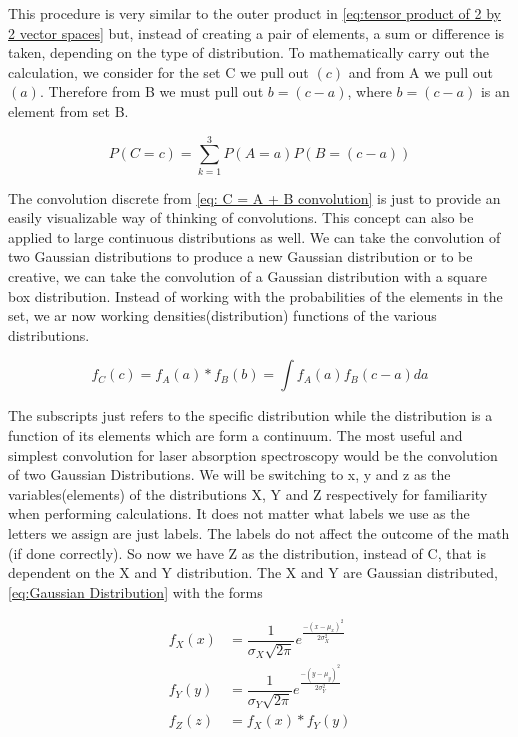 \documentclass[11pt,a4paper]{book}
\begin{document}
		This procedure is very similar to the outer product in \autoref{eq:tensor product of 2 by 2 vector spaces} but, instead of creating a pair of elements, a sum or difference is taken, depending on the type of distribution. To mathematically carry out the calculation, we consider for the set C we pull out $(c)$ and from A we pull out $(a)$. Therefore from B we must pull out $b = (c-a)$, where $b = (c-a)$ is an element from set B.
		
		\begin{equation}
			\label{eq:convolution set}
			P(C=c)=\sum_{k=1}^3{P(A=a)P
				\left(
					B=(c-a)
				\right)}
		\end{equation}
		
		The convolution discrete from \autoref{eq: C = A + B convolution} is just to provide an easily visualizable way of thinking of convolutions. This concept can also be applied to large continuous distributions as well. We can take the convolution of two Gaussian distributions to produce a new Gaussian distribution or to be creative, we can take the convolution of a Gaussian distribution with a square box distribution. Instead of working with the probabilities of the elements in the set, we ar now working densities(distribution) functions of the various distributions.
		
		\begin{equation}
			\label{eq:convolution distribution}
			f_C(c) = f_A(a) \ast f_B(b) = \int{f_A(a) f_B (c-a) da}
		\end{equation}
		
		The subscripts just refers to the specific distribution while the distribution is a function of its elements which are form a continuum. The most useful and simplest convolution for laser absorption spectroscopy would be the convolution of two Gaussian Distributions. We will be switching to x, y and z as the variables(elements) of the distributions X, Y and Z respectively for familiarity when performing calculations. It does not matter what labels we use as the letters we assign are just labels. The labels do not affect the outcome of the math (if done correctly). So now we have Z as the distribution, instead of C, that is dependent on the X and Y distribution. The X and Y are Gaussian distributed, \autoref{eq:Gaussian Distribution} with the forms
		
		\begin{eqnarray}
			\label{eq: X gaussian distribution}
			f_X(x) & = \dfrac{1}{\sigma_X \sqrt{2 \pi}} e^{\frac{- (x-\mu_x)^2}{2 \sigma_X^2}} \\
			\label{eq: Y gaussian distribution}
			f_Y(y) & = \dfrac{1}{\sigma_Y \sqrt{2 \pi}} e^{\frac{- (y-\mu_y)^2}{2 \sigma_Y^2}} \\
			\label{eq: Z convoluted distribution of X and Y}
			f_Z(z) & = f_X(x) \ast f_Y(y)
		\end{eqnarray}
		
\end{document}
